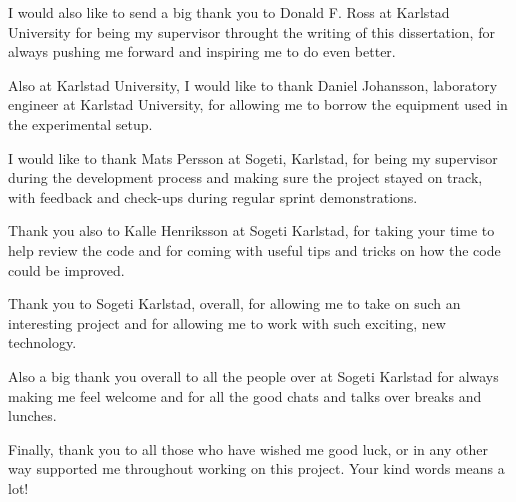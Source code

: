 \documentclass[12pt,twoside]{kau_report}
\begin{document}
\begin{frontmatter}
\begin{acknowledgements}
I would also like to send a big thank you to Donald F. Ross at Karlstad University for being my supervisor throught the writing of this dissertation, for always pushing me forward and inspiring me to do even better.

Also at Karlstad University, I would like to thank Daniel Johansson, laboratory engineer at Karlstad University, for allowing me to borrow the equipment used in the experimental setup.

I would like to thank Mats Persson at Sogeti, Karlstad, for being my supervisor during the development process and making sure the project stayed on track, with feedback and check-ups during regular sprint demonstrations. 

Thank you also to Kalle Henriksson at Sogeti Karlstad, for taking your time to help review the code and for coming with useful tips and tricks on how the code could be improved.

Thank you to Sogeti Karlstad, overall, for allowing me to take on such an interesting project and for allowing me to work with such exciting, new technology. 

Also a big thank you overall to all the people over at Sogeti Karlstad for always making me feel welcome and for all the good chats and talks over breaks and lunches.

Finally, thank you to all those who have wished me good luck, or in any other way supported me throughout working on this project. Your kind words means a lot!








\end{acknowledgements}
\cleardoublepage

  \tableofcontents
  \cleardoublepage

  \listoffigures
  \cleardoublepage

  \listoftables
  \cleardoublepage
  
  \lstlistoflistings
  \cleardoublepage

\end{frontmatter}
\end{document}
